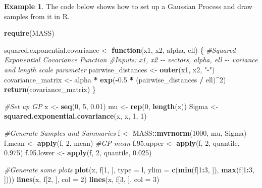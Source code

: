 \documentclass[
]{book}
\newenvironment{Shaded}{\begin{snugshade}}{\end{snugshade}}
\newcommand{\AttributeTok}[1]{\textcolor[rgb]{0.13,0.29,0.53}{#1}}
\newcommand{\CommentTok}[1]{\textcolor[rgb]{0.56,0.35,0.01}{\textit{#1}}}
\newcommand{\ControlFlowTok}[1]{\textcolor[rgb]{0.13,0.29,0.53}{\textbf{#1}}}
\newcommand{\DecValTok}[1]{\textcolor[rgb]{0.00,0.00,0.81}{#1}}
\newcommand{\FloatTok}[1]{\textcolor[rgb]{0.00,0.00,0.81}{#1}}
\newcommand{\FunctionTok}[1]{\textcolor[rgb]{0.13,0.29,0.53}{\textbf{#1}}}
\newcommand{\NormalTok}[1]{#1}
\newcommand{\OtherTok}[1]{\textcolor[rgb]{0.56,0.35,0.01}{#1}}
\newcommand{\SpecialCharTok}[1]{\textcolor[rgb]{0.81,0.36,0.00}{\textbf{#1}}}
\newcommand{\StringTok}[1]{\textcolor[rgb]{0.31,0.60,0.02}{#1}}
\theoremstyle{definition}
\theoremstyle{definition}
\newtheorem{example}{Example}[chapter]
\theoremstyle{definition}
\theoremstyle{definition}
\theoremstyle{remark}
\begin{document}
\begin{example}
The code below shows how to set up a Gaussian Process and draw samples from it in R.

\begin{Shaded}
\begin{Highlighting}[]
\FunctionTok{require}\NormalTok{(MASS)}

\NormalTok{squared.exponential.covariance }\OtherTok{\textless{}{-}} \ControlFlowTok{function}\NormalTok{(x1, x2, alpha, ell) \{}
  \CommentTok{\#Squared Exponential Covariance Function}
  \CommentTok{\#Inputs: x1, x2 {-}{-} vectors, alpha, ell {-}{-} variance and length scale parameter}
\NormalTok{  pairwise\_distances }\OtherTok{\textless{}{-}} \FunctionTok{outer}\NormalTok{(x1, x2, }\StringTok{"{-}"}\NormalTok{)}
\NormalTok{  covariance\_matrix }\OtherTok{\textless{}{-}}\NormalTok{ alpha }\SpecialCharTok{*} \FunctionTok{exp}\NormalTok{(}\SpecialCharTok{{-}}\FloatTok{0.5} \SpecialCharTok{*}\NormalTok{ (pairwise\_distances }\SpecialCharTok{/}\NormalTok{ ell)}\SpecialCharTok{\^{}}\DecValTok{2}\NormalTok{)}
  \FunctionTok{return}\NormalTok{(covariance\_matrix)}
\NormalTok{\}}

\CommentTok{\#Set up GP}
\NormalTok{x }\OtherTok{\textless{}{-}} \FunctionTok{seq}\NormalTok{(}\DecValTok{0}\NormalTok{, }\DecValTok{5}\NormalTok{, }\FloatTok{0.01}\NormalTok{)}
\NormalTok{mu }\OtherTok{\textless{}{-}} \FunctionTok{rep}\NormalTok{(}\DecValTok{0}\NormalTok{, }\FunctionTok{length}\NormalTok{(x))}
\NormalTok{Sigma }\OtherTok{\textless{}{-}} \FunctionTok{squared.exponential.covariance}\NormalTok{(x, x, }\DecValTok{1}\NormalTok{, }\DecValTok{1}\NormalTok{)}

\CommentTok{\#Generate Samples and Summaries}
\NormalTok{f }\OtherTok{\textless{}{-}}\NormalTok{ MASS}\SpecialCharTok{::}\FunctionTok{mvrnorm}\NormalTok{(}\DecValTok{1000}\NormalTok{, mu, Sigma)}
\NormalTok{f.mean }\OtherTok{\textless{}{-}} \FunctionTok{apply}\NormalTok{(f, }\DecValTok{2}\NormalTok{, mean) }\CommentTok{\#GP mean}
\NormalTok{f.}\FloatTok{95.}\NormalTok{upper }\OtherTok{\textless{}{-}} \FunctionTok{apply}\NormalTok{(f, }\DecValTok{2}\NormalTok{, quantile, }\FloatTok{0.975}\NormalTok{)}
\NormalTok{f.}\FloatTok{95.}\NormalTok{lower }\OtherTok{\textless{}{-}} \FunctionTok{apply}\NormalTok{(f, }\DecValTok{2}\NormalTok{, quantile, }\FloatTok{0.025}\NormalTok{)}

\CommentTok{\#Generate some plots}
\FunctionTok{plot}\NormalTok{(x, f[}\DecValTok{1}\NormalTok{, ], }\AttributeTok{type =} \StringTok{\textquotesingle{}l\textquotesingle{}}\NormalTok{, }\AttributeTok{ylim =} \FunctionTok{c}\NormalTok{(}\FunctionTok{min}\NormalTok{(f[}\DecValTok{1}\SpecialCharTok{:}\DecValTok{3}\NormalTok{, ]), }\FunctionTok{max}\NormalTok{(f[}\DecValTok{1}\SpecialCharTok{:}\DecValTok{3}\NormalTok{, ])))}
\FunctionTok{lines}\NormalTok{(x, f[}\DecValTok{2}\NormalTok{, ], }\AttributeTok{col =} \DecValTok{2}\NormalTok{)}
\FunctionTok{lines}\NormalTok{(x, f[}\DecValTok{3}\NormalTok{, ], }\AttributeTok{col =} \DecValTok{3}\NormalTok{)}
\end{Highlighting}
\end{Shaded}


\end{example}
\end{document}
